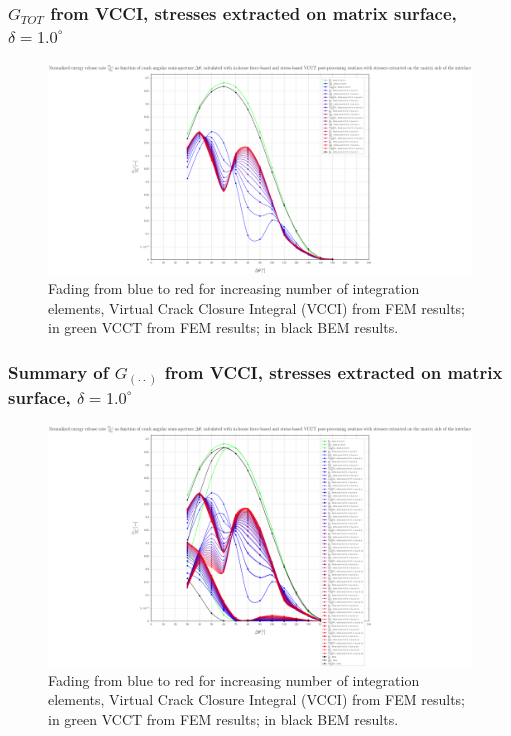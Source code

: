 \begin{frame}
\frametitle{\small $G_{TOT}$ from VCCI, stresses extracted on matrix surface, $\delta=1.0^{\circ}$}
\vspace{-0.5cm}
\centering
\captionsetup[figure]{font=scriptsize,labelfont=scriptsize}
\begin{figure}[!h]
\centering
\includegraphics[height=0.7\textheight]{2017-07-25_AbqRunSummary_SmallStrain_D10/pdf/2017-07-25_AbqRunSummary_SmallStrain_D10_F-SoM-VCCT_GTOT.pdf}
  \caption{\scriptsize Fading from blue to red for increasing number of integration elements, Virtual Crack Closure Integral (VCCI) from FEM results; in green VCCT from FEM results; in black BEM results.}
  \label{fig:res1}
\end{figure}
\end{frame}
\begin{frame}
\frametitle{\small Summary of $G_{\left(\cdot\cdot\right)}$ from VCCI, stresses extracted on matrix surface, $\delta=1.0^{\circ}$}
\vspace{-0.5cm}
\centering
\captionsetup[figure]{font=scriptsize,labelfont=scriptsize}
\begin{figure}[!h]
\centering
\includegraphics[height=0.7\textheight]{2017-07-25_AbqRunSummary_SmallStrain_D10/pdf/2017-07-25_AbqRunSummary_SmallStrain_D10_F-SoM-VCCT_Summary.pdf}
  \caption{\scriptsize Fading from blue to red for increasing number of integration elements, Virtual Crack Closure Integral (VCCI) from FEM results; in green VCCT from FEM results; in black BEM results.}
  \label{fig:res1}
\end{figure}
\end{frame}
